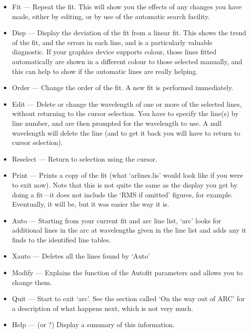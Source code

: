 \documentclass[11pt,twoside]{article}
\newcommand{\latorhtm}[2]{#1}
\newcommand{\latorhtm}[2]{#2}
\begin{document}
\begin{itemize}
\item
   Fit \latorhtm{---}{-} Repeat the fit.  This will show you the effects of any
   changes you have made, either by editing, or by use of the automatic
   search facility.
\item
   Disp \latorhtm{---}{-} Display the deviation of the fit from a linear fit.
   This
   shows the trend of the fit, and the errors in each line, and is a
   particularly valuable diagnostic.  If your graphics device supports
   colour, those lines fitted automatically are shown in a different
   colour to those selected manually, and this can help to show if the
   automatic lines are really helping.
\item
   Order \latorhtm{---}{-} Change the order of the fit.  A new fit is performed
   immediately.
\item
   Edit \latorhtm{---}{-} Delete or change the wavelength of one or more of the
   selected lines, without returning to the cursor selection.  You have
   to specify the line(s) by line number, and are then prompted for the
   wavelength to use.  A null wavelength will delete the line (and to
   get it back you will have to return to cursor selection).
\item
   Reselect \latorhtm{---}{-} Return to selection using the cursor.
\item
   Print \latorhtm{---}{-} Prints a copy of the fit (what `arlines.lis' would
   look
   like if you were to exit now).  Note that this is not quite the same
   as the display you get by doing a fit\latorhtm{---}{-}it does not include
   the `RMS
   if omitted' figures, for example.  Eventually, it will be, but it was
   easier the way it is.
\item
   Auto \latorhtm{---}{-} Starting from your current fit and arc line list,
   `arc'
   looks for additional lines in the arc at wavelengths given in the
   line list and adds any it finds to the identified line tables.
\item
   Xauto \latorhtm{---}{-} Deletes all the lines found by `Auto'
\item
   Modify \latorhtm{---}{-} Explains the function of the Autofit parameters and
   allows you to change them.
\item
   Quit \latorhtm{---}{-} Start to exit `arc'.  See the section called `On
   the way out
   of ARC' for a description of what happens next, which is not very
   much.
\item
   Help \latorhtm{---}{-} (or ?) Display a summary of this information.
\end{itemize}
\end{document}
